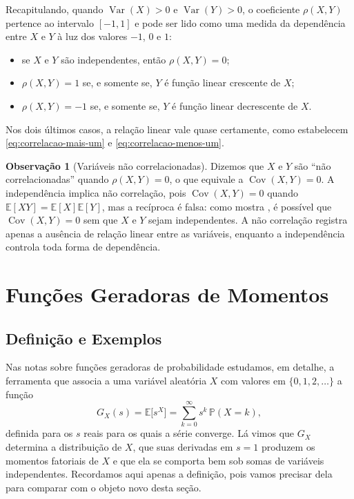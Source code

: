 \documentclass[12pt,portuguese]{article}
\theoremstyle{definition}
\newtheorem{remark}[remark]{Observação}
\theoremstyle{plainexercise}
\theoremstyle{starredexercise}
\theoremstyle{definition}
\begin{document}
Recapitulando, quando $\operatorname{Var}(X) > 0$ e $\operatorname{Var}(Y) > 0$,
o coeficiente $\rho(X,Y)$ pertence ao intervalo $[-1, 1]$ e pode ser lido
como uma medida da dependência entre $X$ e $Y$ à luz dos valores $-1$, $0$ e
$1$:
\begin{itemize}
  \item se $X$ e $Y$ são independentes, então $\rho(X,Y) = 0$;
  \item $\rho(X,Y) = 1$ se, e somente se, $Y$ é função linear crescente de $X$;
  \item $\rho(X,Y) = -1$ se, e somente se, $Y$ é função linear decrescente de
        $X$.
\end{itemize}
Nos dois últimos casos, a relação linear vale quase certamente, como
estabelecem \eqref{eq:correlacao-mais-um} e \eqref{eq:correlacao-menos-um}.

\begin{remark}[Variáveis não correlacionadas]\label{rem:nao-correlacionadas}
Dizemos que $X$ e $Y$ são ``não correlacionadas'' quando $\rho(X,Y) = 0$, o
que equivale a $\operatorname{Cov}(X,Y) = 0$. A independência implica não
correlação, pois $\operatorname{Cov}(X,Y) = 0$ quando $\mathbb{E}[XY] =
\mathbb{E}[X]\mathbb{E}[Y]$, mas a recíproca é falsa: como mostra
, é possível que $\operatorname{Cov}(X,Y) = 0$ sem que $X$
e $Y$ sejam independentes. A não correlação registra apenas a ausência de
relação linear entre as variáveis, enquanto a independência controla toda
forma de dependência.
\end{remark}

\section{Funções Geradoras de Momentos}\label{sec:funcoes-geradoras-momentos}

\subsection{Definição e Exemplos}\label{subsec:fgm-definicao}

Nas notas sobre funções geradoras de probabilidade estudamos, em detalhe, a
ferramenta que associa a uma variável aleatória $X$ com valores em
$\{0,1,2,\ldots\}$ a função
\begin{equation}\label{eq:fgp-recordacao}
G_X(s) = \mathbb{E}\bigl[s^X\bigr] = \sum_{k=0}^{\infty} s^k\,\mathbb{P}(X=k),
\end{equation}
definida para os $s$ reais para os quais a série converge. Lá vimos que
$G_X$ determina a distribuição de $X$, que suas derivadas em $s=1$ produzem os
momentos fatoriais de $X$ e que ela se comporta bem sob somas de variáveis
independentes. Recordamos aqui apenas a definição, pois vamos precisar dela
para comparar com o objeto novo desta seção.
\end{document}
